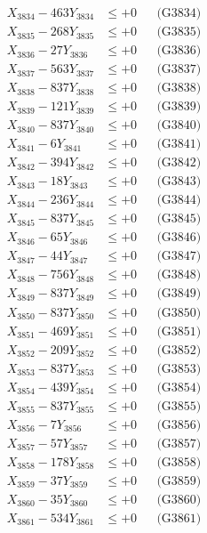 \documentclass[a4paper,10pt]{article}
\begin{document}
{\begin{align}
X_{3834} - 463Y_{3834} &\leq +0 && \text{(G3834)} \\
X_{3835} - 268Y_{3835} &\leq +0 && \text{(G3835)} \\
X_{3836} - 27Y_{3836} &\leq +0 && \text{(G3836)} \\
X_{3837} - 563Y_{3837} &\leq +0 && \text{(G3837)} \\
X_{3838} - 837Y_{3838} &\leq +0 && \text{(G3838)} \\
X_{3839} - 121Y_{3839} &\leq +0 && \text{(G3839)} \\
X_{3840} - 837Y_{3840} &\leq +0 && \text{(G3840)} \\
\allowbreak
X_{3841} - 6Y_{3841} &\leq +0 && \text{(G3841)} \\
X_{3842} - 394Y_{3842} &\leq +0 && \text{(G3842)} \\
X_{3843} - 18Y_{3843} &\leq +0 && \text{(G3843)} \\
X_{3844} - 236Y_{3844} &\leq +0 && \text{(G3844)} \\
X_{3845} - 837Y_{3845} &\leq +0 && \text{(G3845)} \\
X_{3846} - 65Y_{3846} &\leq +0 && \text{(G3846)} \\
X_{3847} - 44Y_{3847} &\leq +0 && \text{(G3847)} \\
X_{3848} - 756Y_{3848} &\leq +0 && \text{(G3848)} \\
X_{3849} - 837Y_{3849} &\leq +0 && \text{(G3849)} \\
X_{3850} - 837Y_{3850} &\leq +0 && \text{(G3850)} \\
\allowbreak
X_{3851} - 469Y_{3851} &\leq +0 && \text{(G3851)} \\
X_{3852} - 209Y_{3852} &\leq +0 && \text{(G3852)} \\
X_{3853} - 837Y_{3853} &\leq +0 && \text{(G3853)} \\
X_{3854} - 439Y_{3854} &\leq +0 && \text{(G3854)} \\
X_{3855} - 837Y_{3855} &\leq +0 && \text{(G3855)} \\
X_{3856} - 7Y_{3856} &\leq +0 && \text{(G3856)} \\
X_{3857} - 57Y_{3857} &\leq +0 && \text{(G3857)} \\
X_{3858} - 178Y_{3858} &\leq +0 && \text{(G3858)} \\
X_{3859} - 37Y_{3859} &\leq +0 && \text{(G3859)} \\
X_{3860} - 35Y_{3860} &\leq +0 && \text{(G3860)} \\
\allowbreak
X_{3861} - 534Y_{3861} &\leq +0 && \text{(G3861)} \\

\end{align}}
\end{document}
